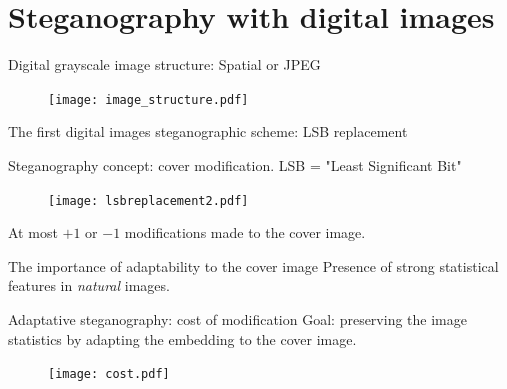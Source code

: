\documentclass[10pt,aspectratio=169]{beamer}
\begin{document}
\section*{Steganography with digital images}

\begin{frame}{Digital grayscale image structure: Spatial or JPEG}

    \begin{figure}[h]
        \texttt{[image: image\_structure.pdf]}
    \end{figure}


\end{frame}


\begin{frame}{The first digital images steganographic scheme: LSB replacement}

    Steganography concept: cover modification. 
    \alert{LSB} = "\alert{L}east \alert{S}ignificant \alert{B}it"
    \begin{figure}[h]
        \texttt{[image: lsbreplacement2.pdf]}
    \end{figure}
    \pause
    At most $+1$ or $-1$ modifications made to the cover image.
\end{frame}

\begin{frame}{The importance of adaptability to the cover image}
    Presence of strong \alert{statistical features} in \textit{natural} images.
    \begin{figure}[h]
    \end{figure}
\end{frame}

\begin{frame}{Adaptative steganography: cost of modification}
    Goal: preserving the image statistics by adapting the embedding to the cover image. 
    \begin{figure}[h]
        \texttt{[image: cost.pdf]}
    \end{figure}
\end{frame}
\end{document}
